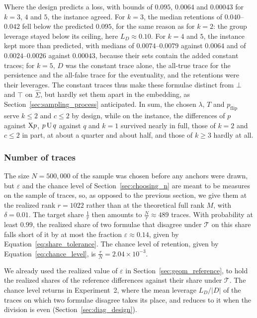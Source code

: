\documentclass[titlepage,a4paper,11pt]{report}
\begin{document}
    Where the design predicts a loss, with bounds of $0.095$, $0.0064$ and $0.00043$ for $k=3$, $4$ and $5$, the instance agreed. For $k=3$, the median retentions of $0.040$--$0.042$ fell below the predicted $0.095$, for the same reason as for $k=2$: the group leverage stayed below its ceiling, here $L_D\approx0.10$. For $k=4$ and $5$, the instance kept more than predicted, with medians of $0.0074$--$0.0079$ against $0.0064$ and of $0.0024$--$0.0026$ against $0.00043$, because their sets contain the added constant traces; for $k=5$, $D$ was the constant trace alone, the all-true trace for the persistence and the all-false trace for the eventuality, and the retentions were their leverages. The constant traces thus make these formulae distinct from $\bot$ and $\top$ on $\widehat\Sigma$, but hardly set them apart in the embedding, as Section~\ref{sec:sampling_process} anticipated. In sum, the chosen $\lambda$, $T$ and $p_{\text{flip}}$ serve $k\le2$ and $c\le2$ by design, while on the instance, the differences of $p$ against $\text{X} p$, $p\,\text{U}\,q$ against $q$ and $k=1$ survived nearly in full, those of $k=2$ and $c\le2$ in part, at about a quarter and about half, and those of $k\ge3$ hardly at all.

    \subsubsection{Number of traces}\label{sec:geom_sample_size}
    The size $N=500{,}000$ of the sample was chosen before any anchors were drawn, but $\varepsilon$ and the chance level of Section~\ref{sec:choosing_n} are meant to be measures on the sample of traces, so, as opposed to the previous section, we give them at the realized rank $r=1022$ rather than at the theoretical full rank $M$, with $\delta=0.01$. The target share $\frac1r$ then amounts to $\frac Nr\approx489$ traces. With probability at least $0.99$, the realized share of two formulae that disagree under $\mathcal T$ on this share falls short of it by at most the fraction $\varepsilon\approx0.14$, given by  Equation~\eqref{eq:share_tolerance}. The chance level of retention, given by Equation~\eqref{eq:chance_level}, is $\frac rN=2.04\times10^{-3}$.
    
    We already used the realized value of $\varepsilon$ in Section~\ref{sec:geom_reference}, to hold the realized shares of the reference differences against their share under $\mathcal T$. The chance level returns in Experiment~2, where the mean leverage $L_D/|D|$ of the traces on which two formulae disagree takes its place, and reduces to it when the division is even (Section~\ref{sec:diag_design}).
\end{document}
